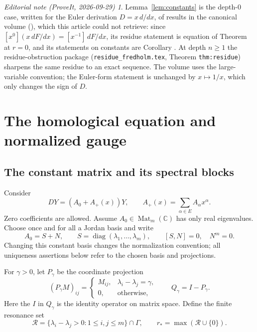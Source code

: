 \documentclass[11pt,a4paper]{article}
\numberwithin{equation}{section}
\theoremstyle{definition}
\theoremstyle{remark}
\newtheorem*{ednote}{Editorial note (ProveIt, 2026-09-29)}
\newcommand{\C}{\mathbb C}
\newcommand{\G}{\Gamma}
\newcommand{\Res}{\mathcal R}
\newcommand{\Mat}{\operatorname{Mat}}
\newcommand{\diag}{\operatorname{diag}}
\newcommand{\Aplus}{A_{+}}
\begin{document}
\begin{ednote}\label{ed:constants}
Lemma~\ref{lem:constants} is the depth-$0$ case, written for the Euler
derivation $D=x\,d/dx$, of results in the canonical volume
(),
which this article could not retrieve: since $[x^0](x\,dF/dx)=[x^{-1}]\,dF/dx$,
its residue statement is equation  of Theorem
 at $r=0$, and its statements on constants
are Corollary . At depth $n\ge1$ the
residue-obstruction package
(\texttt{residue\_fredholm.tex}, Theorem \texttt{thm:residue}) sharpens the
same residue to an exact sequence. The volume uses the large-variable
convention; the Euler-form statement is unchanged by $x\mapsto1/x$, which
only changes the sign of $D$.
\end{ednote}

\section{The homological equation and normalized gauge}
\label{sec:normal}

\subsection{The constant matrix and its spectral blocks}
Consider
\begin{equation}\label{eq:system}
 DY=(A_0+\Aplus(x))Y,\qquad
 \Aplus(x)=\sum_{\alpha\in E}A_\alpha x^\alpha.
\end{equation}
Zero coefficients are allowed. Assume $A_0\in\Mat_m(\C)$ has only real
eigenvalues. Choose once and for all a Jordan basis and write
\begin{equation}\label{eq:jordan}
 A_0=S+N,\qquad S=\diag(\lambda_1,\ldots,\lambda_m),\qquad
 [S,N]=0,\quad N^m=0.
\end{equation}
Changing this constant basis changes the normalization convention; all
uniqueness assertions below refer to the chosen basis and projections.

For $\gamma>0$, let $P_\gamma$ be the coordinate projection
\begin{equation}\label{eq:projection}
 (P_\gamma M)_{ij}=
 \begin{cases}M_{ij},&\lambda_i-\lambda_j=\gamma,\\0,&\text{otherwise},\end{cases}
 \qquad Q_\gamma=I-P_\gamma.
\end{equation}
Here the $I$ in $Q_\gamma$ is the identity operator on matrix space.
Define the finite resonance set
\begin{equation}\label{eq:resonances}
 \Res=\{\lambda_i-\lambda_j>0:1\leq i,j\leq m\}\cap\G,
 \qquad r_* = \max(\Res\cup\{0\}).
\end{equation}
\end{document}
